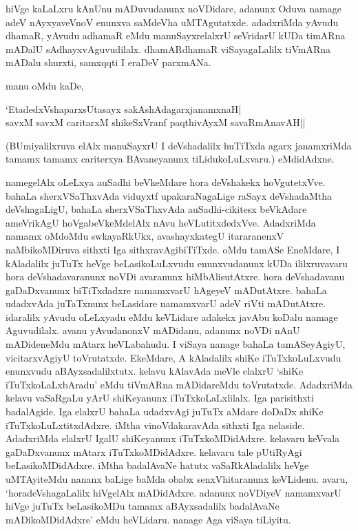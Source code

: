 hiVge kaLaLxru kAnUnu mADuvudanunx noVDidare, adanunx Oduva namage adeV nAyxyaveVnoV enunxva saMdeVha uMTAgutatxde. adadxriMda yAvudu dhamaR, yAvudu adhamaR eMdu manuSayxrelalxrU seVridarU kUDa timARna mADalU sAdhayxvAguvudilalx. dhamARdhamaR viSayagaLalilx tiVmARna mADalu shurxti, samxqqti I eraDeV parxmANa. 

manu oMdu kaDe,

\begin{shloka}
`EtadedxVshaparxsUtasayx sakAshAdagarxjanamxnaH|\\
savxM savxM caritarxM shikeSxVranf paqthivAyxM savaRmAnavAH||
\end{shloka}

(BUmiyalilxruva elAlx manuSayxrU I deVshadalilx huTiTxda agarx janamxriMda tamamx tamamx cariterxya BAvaneyanunx tiLidukoLuLxvaru.) eMdidAdxne.

namegelAlx oLeLxya auSadhi beVkeMdare hora deVshakekx hoVgutetxVve. bahaLa sherxVSaThxvAda viduyxtf upakaraNagaLige raSayx deVshadaMtha deVshagaLigU, bahaLa sherxVSaThxvAda auSadhi-cikitesx beVkAdare ameVrikAgU hoVgabeVkeMdelAlx nAvu heVLutitxdedxVve. AdadxriMda namamx oMdoMdu swkayaRkUkx, avashayxkategU itararanenxV naMbikoMDiruva sithxti Iga sithxravAgibiTiTxde. oMdu tamASe EneMdare, I kAladalilx juTuTx heVge beLasikoLuLxvudu enunxvudanunx kUDa ililxruvavaru hora deVshadavaranunx noVDi avaranunx hiMbAlisutAtxre. hora deVshadavanu gaDaDxvanunx biTiTxdadxre namamxvarU hAgeyeV mADutAtxre. bahaLa udadxvAda juTaTxnunx beLasidare namamxvarU adeV riVti mADutAtxre. idaralilx yAvudu oLeLxyadu eMdu keVLidare adakekx javAbu koDalu namage Aguvudilalx. avanu yAvudanonxV mADidanu, adanunx noVDi nAnU mADideneMdu mAtarx heVLabahudu. I viSaya nanage bahaLa tamASeyAgiyU, vicitarxvAgiyU toVrutatxde. EkeMdare, A kAladalilx shiKe iTuTxkoLuLxvudu enunxvudu aBAyxsadalilxtutx. kelavu kAlavAda meVle elalxrU `shiKe iTuTxkoLaLxbAradu' eMdu tiVmARna mADidareMdu toVrutatxde. AdadxriMda kelavu vaSaRgaLu yArU shiKeyanunx iTuTxkoLaLxlilalx. Iga parisithxti badalAgide. Iga elalxrU bahaLa udadxvAgi juTuTx aMdare doDaDx shiKe iTuTxkoLuLxtitxdAdxre. iMtha vinoVdakaravAda sithxti Iga nelaside. AdadxriMda elalxrU IgalU shiKeyanunx iTuTxkoMDidAdxre. kelavaru keVvala gaDaDxvanunx mAtarx iTuTxkoMDidAdxre. kelavaru tale pUtiRyAgi beLasikoMDidAdxre. iMtha badalAvaNe hatutx vaSaRkAladalilx heVge uMTAyiteMdu nananx baLige baMda obabx senxVhitaranunx keVLidenu. avaru, `horadeVshagaLalilx hiVgelAlx mADidAdxre. adanunx noVDiyeV namamxvarU hiVge juTuTx beLasikoMDu tamamx aBAyxsadalilx badalAvaNe mADikoMDidAdxre' eMdu heVLidaru. nanage Aga viSaya tiLiyitu. 

